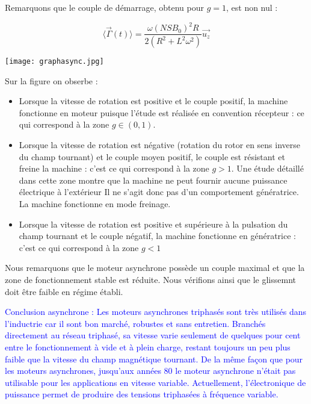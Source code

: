 \documentclass{article}
\begin{document}
Remarquons que le couple de démarrage, obtenu pour $g=1$, est non nul :

\begin{equation}
    \langle \vec{\Gamma}(t) \rangle = \frac{\omega (NSB_0)^2R}{2(R^2 + L^2\omega^2)}\vec{u_z}
\end{equation}


\begin{center}
    \texttt{[image: graphasync.jpg]}
\end{center}



Sur la figure on obserbe :

\begin{itemize}
    \item Lorsque la vitesse de rotation est positive et le couple positif, la machine fonctionne en moteur puisque l'étude est réalisée en convention récepteur : ce qui correspond à la zone $g \in (0,1)$.
    \item Lorsque la vitesse de rotation est négative (rotation du rotor en sens inverse du champ tournant) et le couple moyen positif, le couple est résistant et freine la machine : c'est ce qui correspond à la zone $g > 1$. Une étude détaillé dans cette zone montre que la machine ne peut fournir aucune puissance électrique à l'extérieur Il ne s'agit donc pas d'un comportement génératrice. La machine fonctionne en mode freinage.
    \item Lorsque la vitesse de rotation est positive et supérieure à la pulsation du champ tournant et le couple négatif, la machine fonctionne en génératrice : c'est ce qui correspond à la zone $g<1$
\end{itemize}

Nous remarquons que le moteur asynchrone possède un couple maximal et que la zone de fonctionnement stable est réduite. Nous vérifions ainsi que le glissemnt doit être faible en régime établi.\medskip


\textcolor{blue}{Conclusion asynchrone : Les moteurs asynchrones triphasés sont très utilisés dans l'inductrie car il sont bon marché, robustes et sans entretien. Branchés directement au réseau triphasé, sa vitesse varie seulement de quelques pour cent entre le fonctionnement à vide et à plein charge, restant toujours un peu plus faible que la vitesse du champ magnétique tournant. De la même façon que pour les moteurs asynchrones, jusqu'aux années 80 le moteur asynchrone n'était pas utilisable pour les applications en vitesse variable. Actuellement, l'électronique de puissance permet de produire des tensions triphasées à fréquence variable.}
\end{document}
